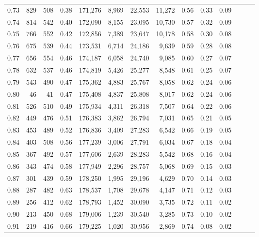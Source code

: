 \begin{tabular}{rrrrrrrrrrrrrr}
0.73 &    829 &  508 &  0.38 &  171,276 &    8,969 &  22,553 &  11,272 &  0.56 &  0.33 &      0.09 \\
0.74 &    814 &  542 &  0.40 &  172,090 &    8,155 &  23,095 &  10,730 &  0.57 &  0.32 &      0.09 \\
0.75 &    766 &  552 &  0.42 &  172,856 &    7,389 &  23,647 &  10,178 &  0.58 &  0.30 &      0.08 \\
0.76 &    675 &  539 &  0.44 &  173,531 &    6,714 &  24,186 &   9,639 &  0.59 &  0.28 &      0.08 \\
0.77 &    656 &  554 &  0.46 &  174,187 &    6,058 &  24,740 &   9,085 &  0.60 &  0.27 &      0.07 \\
0.78 &    632 &  537 &  0.46 &  174,819 &    5,426 &  25,277 &   8,548 &  0.61 &  0.25 &      0.07 \\
0.79 &    543 &  490 &  0.47 &  175,362 &    4,883 &  25,767 &   8,058 &  0.62 &  0.24 &      0.06 \\
0.80 &     46 &   41 &  0.47 &  175,408 &    4,837 &  25,808 &   8,017 &  0.62 &  0.24 &      0.06 \\
0.81 &    526 &  510 &  0.49 &  175,934 &    4,311 &  26,318 &   7,507 &  0.64 &  0.22 &      0.06 \\
0.82 &    449 &  476 &  0.51 &  176,383 &    3,862 &  26,794 &   7,031 &  0.65 &  0.21 &      0.05 \\
0.83 &    453 &  489 &  0.52 &  176,836 &    3,409 &  27,283 &   6,542 &  0.66 &  0.19 &      0.05 \\
0.84 &    403 &  508 &  0.56 &  177,239 &    3,006 &  27,791 &   6,034 &  0.67 &  0.18 &      0.04 \\
0.85 &    367 &  492 &  0.57 &  177,606 &    2,639 &  28,283 &   5,542 &  0.68 &  0.16 &      0.04 \\
0.86 &    343 &  474 &  0.58 &  177,949 &    2,296 &  28,757 &   5,068 &  0.69 &  0.15 &      0.03 \\
0.87 &    301 &  439 &  0.59 &  178,250 &    1,995 &  29,196 &   4,629 &  0.70 &  0.14 &      0.03 \\
0.88 &    287 &  482 &  0.63 &  178,537 &    1,708 &  29,678 &   4,147 &  0.71 &  0.12 &      0.03 \\
0.89 &    256 &  412 &  0.62 &  178,793 &    1,452 &  30,090 &   3,735 &  0.72 &  0.11 &      0.02 \\
0.90 &    213 &  450 &  0.68 &  179,006 &    1,239 &  30,540 &   3,285 &  0.73 &  0.10 &      0.02 \\
0.91 &    219 &  416 &  0.66 &  179,225 &    1,020 &  30,956 &   2,869 &  0.74 &  0.08 &      0.02 \\

\end{tabular}

